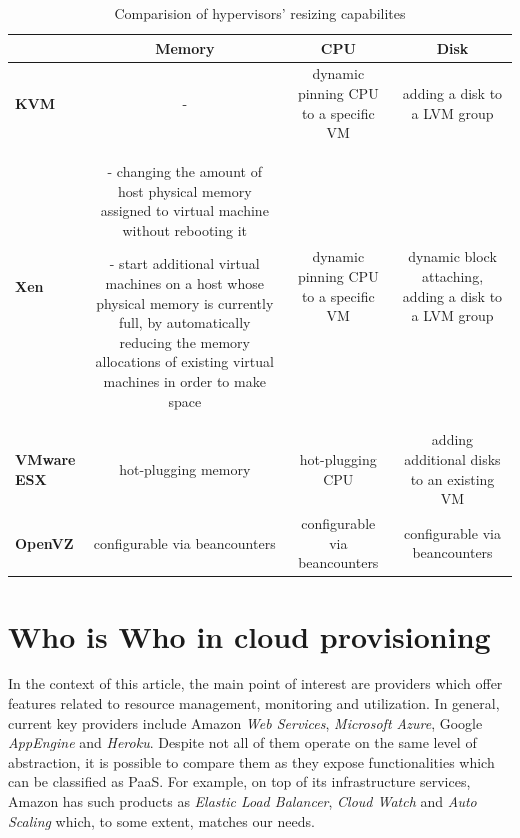 \documentclass[twocolumn]{svjour3}          %
\begin{document}
\begin{table}[ht]
  \renewcommand{\arraystretch}{2}
  \begin{tabular}{p{4cm} | *{3}{C}}
     & \textbf{Memory} & \textbf{CPU} & \textbf{Disk} \\ \hline

   \textbf{KVM} & 
   - &
   dynamic pinning CPU to a specific VM \footnotemark[1] &
   adding a disk to a LVM group 
   \\ \hline

   \textbf{Xen} &
  - changing the amount of host physical memory assigned to virtual machine without rebooting it

  - start additional virtual machines on a host whose physical memory is currently full, by automatically reducing the memory allocations of existing virtual machines in order to make space &
  dynamic pinning CPU to a specific VM \footnotemark[1] &
  dynamic block attaching, adding a disk to a LVM group
  \\ \hline

  \textbf{VMware ESX} &
hot-plugging memory \footnotemark[2] & 
hot-plugging CPU \footnotemark[2]  &
adding additional disks to an existing VM
\\ \hline

\textbf{OpenVZ} & configurable via beancounters & configurable via beancounters & configurable via beancounters\\ \hline



\end{tabular}

\caption{Comparision of hypervisors' resizing capabilites}
\label{tab:hypervisors-resizing}

\end{table}


\section{Who is Who in cloud provisioning}
In the context of this article, the main point of interest are providers which offer features related to resource management, monitoring and utilization. In general, current key providers include Amazon \emph{Web Services}, \emph{Microsoft Azure}, Google \emph{AppEngine} and \emph{Heroku}. Despite not all of them operate on the same level of abstraction, it is possible to compare them as they expose functionalities which can be classified as PaaS. For example, on top of its infrastructure services, Amazon has such products as \emph{Elastic Load Balancer}, \emph{Cloud Watch} and \emph{Auto Scaling} which, to some extent, matches our needs.
\end{document}
